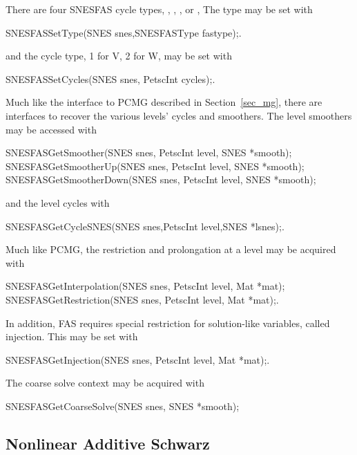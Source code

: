 There are four SNESFAS cycle
types, , , ,
or , The type may be set with
\begin{tabbing}
SNESFASSetType(SNES snes,SNESFASType fastype);.
\end{tabbing}
\noindent and the cycle type, 1 for V, 2 for W, may be set with
\begin{tabbing}
SNESFASSetCycles(SNES snes, PetscInt cycles);.
\end{tabbing}
Much like the interface to PCMG described in Section~\ref{sec_mg}, there are
interfaces to recover the various levels' cycles and smoothers. The level
smoothers may be accessed with
\begin{tabbing}
SNESFASGetSmoother(SNES snes, PetscInt level, SNES *smooth);\\
SNESFASGetSmootherUp(SNES snes, PetscInt level, SNES *smooth);\\
SNESFASGetSmootherDown(SNES snes, PetscInt level, SNES *smooth);
\end{tabbing}
\noindent and the level cycles with
\begin{tabbing}
SNESFASGetCycleSNES(SNES snes,PetscInt level,SNES *lsnes);.
\end{tabbing}
Much like PCMG, the restriction and prolongation at a level may be acquired with
\begin{tabbing}
SNESFASGetInterpolation(SNES snes, PetscInt level, Mat *mat);
SNESFASGetRestriction(SNES snes, PetscInt level, Mat *mat);.
\end{tabbing}
In addition, FAS requires special restriction for solution-like variables,
called injection.  This may be set with
\begin{tabbing}
SNESFASGetInjection(SNES snes, PetscInt level, Mat *mat);.
\end{tabbing}
The coarse solve context may be acquired with
\begin{tabbing}
SNESFASGetCoarseSolve(SNES snes, SNES *smooth);
\end{tabbing}

\subsection{Nonlinear Additive Schwarz}

